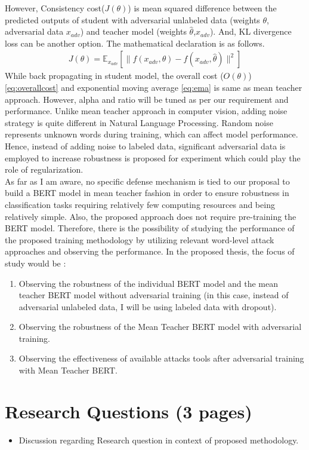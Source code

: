 \documentclass[%
	BCOR=8mm, %
	DIV=12, 
	toc=bibliography, %
	toc=listof, %
	oneside, %
	egregdoesnotlikesansseriftitles, %
	]{scrbook}
\begin{document}
However, Consistency cost($J(\theta)$) is mean squared difference between the predicted outputs of student with adversarial unlabeled data (weights $\theta$, adversarial data $x_{adv}$) and teacher model (weights $\hat\theta$,$x_{adv}$). And, KL divergence loss can be another option. The mathematical declaration is as follows. 
\begin{equation}
\begin{aligned}
J( \theta )=\mathbb{E}_{x_{adv}}[\|f(x_{adv},\theta)-f(x_{adv},\hat\theta)\|^2] 
\label{eq:ADVconsistencycost}
\end{aligned}
\end{equation}
While back propagating in student model, the overall cost ($\textit{O}(\theta)$) \ref{eq:overallcost}  and exponential moving average \ref{eq:ema} is same as mean teacher approach. However, alpha and ratio will be tuned as per our requirement and performance. 
Unlike mean teacher approach in computer vision, adding noise strategy is quite different in Natural Language Processing. Random noise represents unknown words during training, which can affect model performance. Hence, instead of adding noise to labeled data, significant adversarial data is employed to increase robustness is proposed for experiment which could play the role of regularization.\\
As far as I am aware, no specific defense mechanism is tied to our proposal to build a BERT model in mean teacher fashion in order to ensure robustness in classification tasks requiring relatively few computing resources and being relatively simple. Also, the proposed approach does not require pre-training the BERT model. Therefore, there is the possibility of studying the performance of the proposed training methodology by utilizing relevant word-level attack approaches and observing the performance.
In the proposed thesis, the focus of study would be :
\begin{enumerate}
\item Observing the robustness of the individual BERT model and the mean teacher BERT model without adversarial training (in this case, instead of adversarial unlabeled data, I will be using labeled data with dropout).
\item Observing the robustness of the Mean Teacher BERT model with adversarial training.
\item Observing the effectiveness of available attacks tools after adversarial training with Mean Teacher BERT.
\end{enumerate}
\section{Research Questions (3 pages)}
\begin{itemize}
\item Discussion regarding Research question in context of proposed methodology.
\end{itemize}
\end{document}
